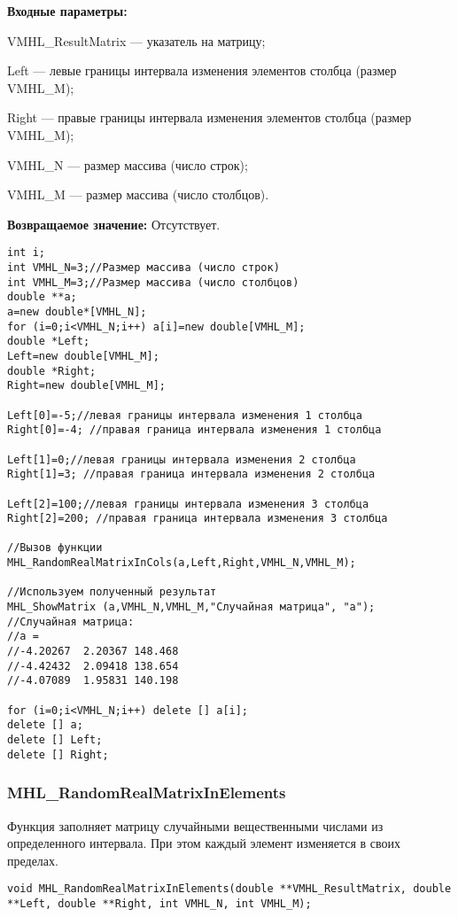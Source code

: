 \documentclass[a4paper,12pt]{article}
\begin{document}
\textbf{Входные параметры:}

 VMHL\_ResultMatrix --- указатель на матрицу;
 
 Left --- левые границы интервала изменения элементов столбца (размер VMHL\_M);
 
 Right --- правые границы интервала изменения элементов столбца (размер VMHL\_M);
 
 VMHL\_N --- размер массива (число строк);
 
 VMHL\_M --- размер массива (число столбцов).

\textbf{Возвращаемое значение:}
Отсутствует.


\begin{lstlisting}[label=code_use_MHL_RandomRealMatrixInCols,caption=Пример использования]
int i;
int VMHL_N=3;//Размер массива (число строк)
int VMHL_M=3;//Размер массива (число столбцов)
double **a;
a=new double*[VMHL_N];
for (i=0;i<VMHL_N;i++) a[i]=new double[VMHL_M];
double *Left;
Left=new double[VMHL_M];
double *Right;
Right=new double[VMHL_M];

Left[0]=-5;//левая границы интервала изменения 1 столбца
Right[0]=-4; //правая граница интервала изменения 1 столбца

Left[1]=0;//левая границы интервала изменения 2 столбца
Right[1]=3; //правая граница интервала изменения 2 столбца

Left[2]=100;//левая границы интервала изменения 3 столбца
Right[2]=200; //правая граница интервала изменения 3 столбца

//Вызов функции
MHL_RandomRealMatrixInCols(a,Left,Right,VMHL_N,VMHL_M);

//Используем полученный результат
MHL_ShowMatrix (a,VMHL_N,VMHL_M,"Случайная матрица", "a");
//Случайная матрица:
//a =
//-4.20267	2.20367	148.468
//-4.42432	2.09418	138.654
//-4.07089	1.95831	140.198

for (i=0;i<VMHL_N;i++) delete [] a[i];
delete [] a;
delete [] Left;
delete [] Right;
\end{lstlisting}

\subsubsection{MHL\_RandomRealMatrixInElements}\label{MHL_RandomRealMatrixInElements}

Функция заполняет матрицу случайными вещественными числами из определенного интервала. При этом каждый элемент изменяется в своих пределах.


\begin{lstlisting}[label=code_syntax_MHL_RandomRealMatrixInElements,caption=Синтаксис]
void MHL_RandomRealMatrixInElements(double **VMHL_ResultMatrix, double **Left, double **Right, int VMHL_N, int VMHL_M);
\end{lstlisting}
\end{document}
